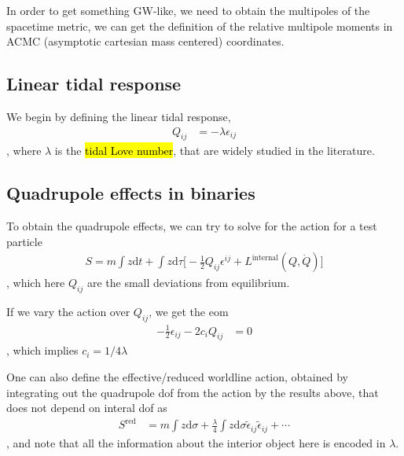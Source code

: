 \documentclass[a4paper, 12pt]{article}
\begin{document}
  In order to get something GW-like, we need to obtain the multipoles
  of the spacetime metric, we can get the definition of the relative
  multipole moments in ACMC (asymptotic cartesian mass
  centered) coordinates.
  
  \subsection{Linear tidal response}%
    \label{sub:Linear tidal response}
    We begin by defining the linear tidal response, 
    \begin{align}
      \label{linear tidal response}
      Q_{ij} &=  - \lambda \epsilon_{ij} 
    \end{align}, where \( \lambda \) is the \hl{tidal Love number},
    that are widely studied in the literature.

    \subsection{Quadrupole effects in binaries}%
      \label{sub:Quadrupole effects in binaries}
      To obtain the quadrupole effects, we can try to solve for the
      action for a test particle 
      \begin{align}
        \label{action for tidal}
        S = m \int z \mathrm{d}t  +  \int z \mathrm{d}\tau \bigg[
        -\frac{1}{2} Q_{ij} \epsilon^{ij} +
        L^{\mathrm{internal}}(Q, \dot{Q})  \bigg]
      \end{align}, which here \( Q_{ij} \) are the small
      deviations from equilibrium.
    
    If we vary the action over \( Q_{ij} \), we get the eom 
    \begin{align}
      \label{eom for Qij}
      - \frac{1}{2} \epsilon_{ij} - 2 c_i Q_{ij} &=  0 
    \end{align}, which implies \( c_i = 1/4\lambda \)
    
    One can also define the effective/reduced worldline action, obtained
    by integrating out the quadrupole dof from the action by the results
    above, that does not depend on interal dof as 
    \begin{align}
      \label{effective reduced tidal action}
      S^{\mathrm{red}} &= m \int z \mathrm{d}\sigma +
      \frac{\lambda}{4} \int z \mathrm{d}\sigma
      \tilde{\epsilon}_{ij} \tilde{\epsilon}_{ij} + \cdots
    \end{align}, and note that all the information about the interior
    object here is encoded
    in \(  \lambda \).
\newpage
   \appendix 
\end{document}
